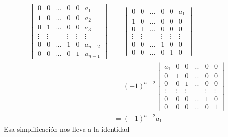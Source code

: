 \documentclass{report}
\theoremstyle{remark}
\begin{document}
  \begin{align}
    \begin{vmatrix}
      0
      &0
      &\dots
      &0
      &0
      &a_1
      \\
      1
      &0
      &\dots
      &0
      &0
      &a_2
      \\
      0
      &1
      &\dots
      &0
      &0
      &a_3
      \\
      \vdots
      &\vdots
      &
      &\vdots
      &\vdots
      &\vdots
      \\
      0
      &0
      &\dots
      &1
      &0
      &a_{n - 2}
      \\
      0
      &0
      &\dots
      &0
      &1
      &a_{n - 1}
    \end{vmatrix}
    &=
    \begin{vmatrix}
      0
      &0
      &\dots
      &0
      &0
      &a_1
      \\
      1
      &0
      &\dots
      &0
      &0
      &0
      \\
      0
      &1
      &\dots
      &0
      &0
      &0
      \\
      \vdots
      &\vdots
      &
      &\vdots
      &\vdots
      &\vdots
      \\
      0
      &0
      &\dots
      &1
      &0
      &0
      \\
      0
      &0
      &\dots
      &0
      &1
      &0
    \end{vmatrix}
    \\
    &=
    (-1)^{n - 2}
    \begin{vmatrix}
      a_1
      &0
      &0
      &\dots
      &0
      &0
      \\
      0
      &1
      &0
      &\dots
      &0
      &0
      \\
      0
      &0
      &1
      &\dots
      &0
      &0
      \\
      \vdots
      &\vdots
      &\vdots
      &
      &\vdots
      &\vdots
      \\
      0
      &0
      &0
      &\dots
      &1
      &0
      \\
      0
      &0
      &0
      &\dots
      &0
      &1
    \end{vmatrix}
    \\
    &=
    (- 1)^{n - 2} a_1
  \end{align}
  Esa simplificación nos lleva a la identidad
\end{document}
